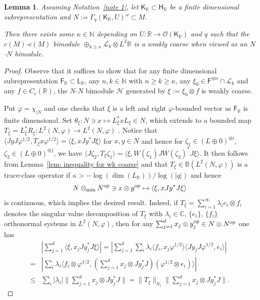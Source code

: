 \documentclass[a4paper,11pt]{amsart}
\newtheorem{lem}[thm]{Lemma}
\theoremstyle{definition}
\newcommand{\B}{{\mathbb B}}
\newcommand{\C}{{\mathbb C}}
\newcommand{\N}{{\mathbb N}}
\newcommand{\R}{{\mathbb R}}
\newcommand{\cH}{{\mathcal H}}
\newcommand{\cL}{{\mathcal L}}
\newcommand{\cO}{{\mathcal O}}
\newcommand{\sH}{\mathsf{H}}
\newcommand{\sK}{\mathsf{K}}
\newcommand{\sL}{\mathsf{L}}
\newcommand{\sF}{\mathsf{F}}
\newcommand{\ot}{\otimes}
\newcommand{\op}{{\rm op}}
\begin{document}
\begin{lem}\label{lem: wk coarse inte step}
Assuming Notation~\ref{note 1},
	let $\sK_\R\subset \sH_\R$ be a finite dimensional subrepresentation
	and $N:=\Gamma_q(\sK_\R, U)''\subset M$.

Then there exists some $\kappa\in \N$ depending on $U:\R\to \cO(\sK_\R)$ and $q$ such that
	the $c(M)$-$c(M)$ bimodule
	$\oplus_{k\geq \kappa}\cL_k\ot L^2\R$ is a weakly coarse when viewed as an $N$-$N$ bimodule.
\end{lem}
\begin{proof}
Observe that it suffices to show that for any finite dimensional subrepresentation $\sF_\R\subset \sL_\R$,
	any $n, k\in \N$ with $n\geq k\geq \kappa$, any 
	$\xi_0 \in \sF^{\ot n}\cap \cL_k$ and any $f\in C_c(\R)$, 
	the $N$-$N$ bimodule $\cH$ generated by $\xi:=\xi_0\ot f$ is weakly coarse.

Put $\varphi=\chi_{\mid N}$ and 
	one checks that $\xi$ is a left and right $\varphi$-bounded vector as $\sF_\R$ is finite dimensional.
Set $\theta_\xi: N\ni x\mapsto L_\xi^* x L_\xi\in N$,
	which extends to a bounded map  $T_\xi=L_\xi^* R_\xi:L^2(N,\varphi)\to L^2(N,\varphi)$ \cite[Lemma 2]{OOT17}.
Notice that $\langle JyJ\varphi^{1/2} , T_\xi x\varphi^{1/2}\rangle=\langle \xi, x Jy^*J\xi\rangle$
	for $x,y\in N$
	and hence for $\zeta_1\in (L\oplus 0)^{\otimes i}$, $\zeta_2\in (L\oplus 0)^{\otimes j}$,
	we have $\langle J\zeta_2, T_\xi \zeta_1\rangle=\langle \xi, W(\zeta_1)JW(\zeta_2)^*J \xi\rangle$.
It then follows from Lemma~\ref{lem: inequality for wk coarse} and \cite[Lemma 6.5]{Wil20} 
	that $T_\xi\in \B(L^2(N,\varphi))$ is a trace-class operator
	if $\kappa>-\log(\dim(L_\R))/\log(|q|)$
	and hence 
	$$
	N\ot_{\rm min} N^{\op}\ni x\ot y^{\op}\mapsto \langle \xi, x Jy^*J\xi\rangle
	$$
	is continuous,
	which implies the desired result.
Indeed, if $T_\xi=\sum_{i=1}^\infty \lambda_i e_i\ot f_i$ denotes the singular value decomposition of $T_\xi$ with $\lambda_i\in \C$,
	$\{e_i\}$, $\{f_i\}$ orthonormal systems in $L^2(N,\varphi)$, 
	then for any $\sum_{j=1}^d x_j\ot y_j^\op\in N\ot N^{\op}$ one has
\[\begin{aligned}
	&|\sum_{j=1}^d\langle \xi, x_j Jy_j^* J\xi\rangle|
	=|\sum_{j=1}^d \sum_i \lambda_i \langle f_i, x_j\varphi^{1/2}\rangle \langle Jy_j J\varphi^{1/2}, e_i\rangle| \\
	=&|\sum_i \lambda_i\langle f_i\ot \varphi^{1/2}, (\sum_{j=1}^d x_j\ot Jy_j^*J)(\varphi^{1/2}\ot e_i)\rangle| \\
	\leq & \sum_i |\lambda_i|\|\sum_{j=1}^d x_j\ot Jy_j^* J\|=\|T_\xi\|_{S_1}\|\sum_{j=1}^d x_j\ot Jy_j^* J\|.
\end{aligned}\]
\end{proof}
\end{document}
